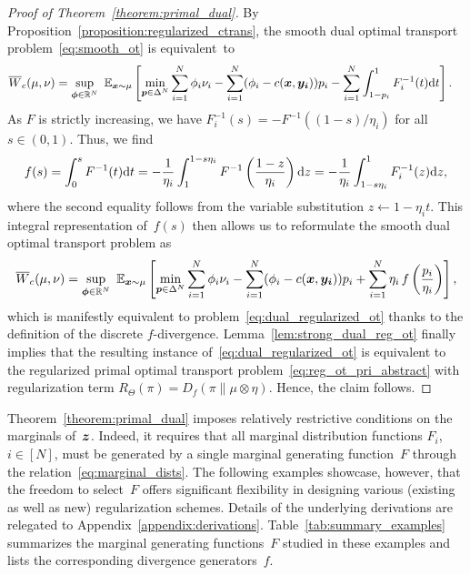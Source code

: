 \documentclass[11pt, a4paper, oneside, reqno]{article}
\begin{document}
    
	\begin{proof} [Proof of Theorem~\ref{theorem:primal_dual}]
		By Proposition~\ref{proposition:regularized_ctrans}, the smooth dual optimal transport problem~\eqref{eq:smooth_ot} is equivalent~to
		\begin{align*}
		    \overline{W}_{c}(\mu, \nu)  &= \sup\limits_{ \boldsymbol {\phi}\in \mathbb{R}^N} ~ \mathbb{E}_{\boldsymbol x \sim \mu}\left[\min\limits_{\boldsymbol p\in \Delta^N} \sum\limits_{i=1}^N{\phi_i\nu_i}- \sum\limits_{i=1}^N(\phi_i - c(\boldsymbol x, \boldsymbol {y_i}))p_i - \sum_{i=1}^N \displaystyle\int_{1-p_i}^1 F_i^{-1}(t)\mathrm{d} t 
		\right].
		\end{align*}
		As $F$ is strictly increasing, we have $F_i^{-1}(s) = -F^{-1}((1-s) / \eta_i)$ for all $s \in (0, 1)$. Thus, we find
		\begin{align}
		\label{eq:integral_rep_f}
    		f(s) = \int_{0}^{s} F^{-1}(t) \mathrm{d} t = -\frac{1}{\eta_i} \int_{1}^{1 - s \eta_i} F^{-1} \left( \frac{1 - z}{\eta_i} \right) \mathrm{d} z= -\frac{1}{ \eta_i} \int_{1 - s \eta_i}^1 F_i^{-1}(z) \mathrm{d} z,
		\end{align}
		where the second equality follows from the variable substitution $z\leftarrow 1-\eta_i t$. This integral representation of~$f(s)$ then allows us to reformulate the smooth dual optimal transport problem as
		\begin{align*}
		    \overline{W}_{c}(\mu, \nu)= \sup\limits_{ \boldsymbol {\phi}\in \mathbb{R}^N} ~ \mathbb{E}_{\boldsymbol x \sim \mu}\left[\min\limits_{\boldsymbol p\in \Delta^N} \sum\limits_{i=1}^N{\phi_i\nu_i}- \sum\limits_{i=1}^N(\phi_i - c(\boldsymbol x, \boldsymbol {y_i}))p_i + \sum\limits_{i=1}^N \eta_i \,f\left( \frac{p_i}{\eta_i} \right) \right],
		\end{align*}
		which is manifestly equivalent to problem~\eqref{eq:dual_regularized_ot} thanks to the definition of the discrete $f$-divergence. Lemma~\ref{lem:strong_dual_reg_ot} finally implies that the resulting instance of~\eqref{eq:dual_regularized_ot} is equivalent to the regularized primal optimal transport problem~\eqref{eq:reg_ot_pri_abstract} with regularization term $R_\Theta (\pi ) =  D_{f}(\pi\|\mu \otimes \eta)$.
		Hence, the claim follows.
	\end{proof}
	
	Theorem~\ref{theorem:primal_dual} imposes relatively restrictive conditions on the marginals of~$\boldsymbol z$. Indeed, it requires that all marginal distribution functions $F_i$, $i\in[N]$, must be generated by a single marginal generating function~$F$ through the relation~\eqref{eq:marginal_dists}. The following examples showcase, however, that the freedom to select~$F$ offers significant flexibility in designing various (existing as well as new) regularization schemes. Details of the underlying derivations are relegated to Appendix~\ref{appendix:derivations}. {\color{black} Table~\ref{tab:summary_examples} summarizes the marginal generating functions~$F$ studied in these examples and lists the corresponding divergence generators~$f$.} 
	
\end{document}
